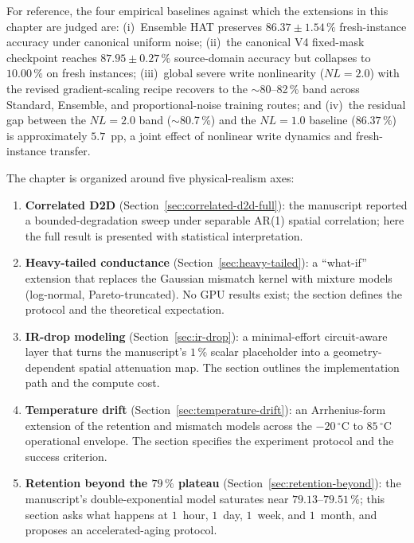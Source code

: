 For reference, the four empirical baselines against which the extensions in this chapter are judged are: (i)~Ensemble HAT preserves $86.37\pm1.54\,\%$ fresh-instance accuracy under canonical uniform noise; (ii)~the canonical V4 fixed-mask checkpoint reaches $87.95\pm0.27\,\%$ source-domain accuracy but collapses to $10.00\,\%$ on fresh instances; (iii)~global severe write nonlinearity ($NL=2.0$) with the revised gradient-scaling recipe recovers to the $\sim$80--82\,\% band across Standard, Ensemble, and proportional-noise training routes; and (iv)~the residual gap between the $NL=2.0$ band ($\sim$80.7\,\%) and the $NL=1.0$ baseline ($86.37\,\%$) is approximately $5.7$~pp, a joint effect of nonlinear write dynamics and fresh-instance transfer.

The chapter is organized around five physical-realism axes:
\begin{enumerate}
    \item \textbf{Correlated D2D} (Section~\ref{sec:correlated-d2d-full}): the manuscript reported a bounded-degradation sweep under separable AR(1) spatial correlation; here the full result is presented with statistical interpretation.
    \item \textbf{Heavy-tailed conductance} (Section~\ref{sec:heavy-tailed}): a ``what-if'' extension that replaces the Gaussian mismatch kernel with mixture models (log-normal, Pareto-truncated).  No GPU results exist; the section defines the protocol and the theoretical expectation.
    \item \textbf{IR-drop modeling} (Section~\ref{sec:ir-drop}): a minimal-effort circuit-aware layer that turns the manuscript's $1\,\%$ scalar placeholder into a geometry-dependent spatial attenuation map.  The section outlines the implementation path and the compute cost.
    \item \textbf{Temperature drift} (Section~\ref{sec:temperature-drift}): an Arrhenius-form extension of the retention and mismatch models across the $-20\,^{\circ}\mathrm{C}$ to $85\,^{\circ}\mathrm{C}$ operational envelope.  The section specifies the experiment protocol and the success criterion.
    \item \textbf{Retention beyond the $79\,\%$ plateau} (Section~\ref{sec:retention-beyond}): the manuscript's double-exponential model saturates near $79.13$--$79.51\,\%$; this section asks what happens at $1$~hour, $1$~day, $1$~week, and $1$~month, and proposes an accelerated-aging protocol.
\end{enumerate}

